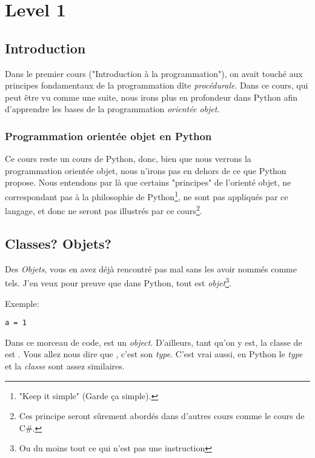 \chapter{Level 1}
\begin{figure}[ht]
\end{figure}

\section{Introduction}

Dans le premier cours ("Introduction à la programmation"), on avait touché aux principes fondamentaux de la programmation dîte \emph{procédurale}. Dans ce cours, qui peut être vu comme une suite, nous irons plus en profondeur dans Python afin d'apprendre les bases de la programmation \emph{orientée objet}.

\subsection{Programmation orientée objet en Python}

Ce cours reste un cours de Python, donc, bien que nous verrons la programmation orientée objet, nous n'irons pas en dehors de ce que Python propose. Nous entendons par là que certains "principes" de l'orienté objet, ne correspondant pas à la philosophie de Python\footnote{"Keep it simple" (Garde ça simple).}, ne sont pas appliqués par ce langage, et donc ne seront pas illustrés par ce cours\footnote{Ces principe seront sûrement abordés dans d'autres cours comme le cours de C\#.}.


\section{Classes? Objets?}

Des \emph{Objets}, vous en avez déjà rencontré pas mal sans les avoir nommés comme tels.
J'en veux pour preuve que dans Python, tout est \emph{objet}\footnote{Ou du moins tout ce qui n'est pas une instruction}.

Exemple:

\begin{lstlisting}
a = 1
\end{lstlisting}

Dans ce morceau de code,  est un \emph{object}.
D'ailleurs, tant qu'on y est, la classe de  est .
Vous allez nous dire que , c'est son \emph{type}. C'est vrai aussi, en Python le \emph{type} et la \emph{classe} sont assez similaires.

